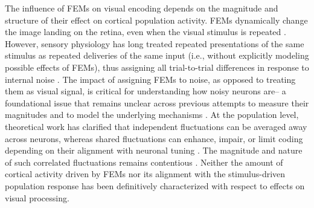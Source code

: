 \documentclass{lite}
\begin{document}
The influence of FEMs on visual encoding depends on the magnitude and structure of their effect on cortical population activity. FEMs dynamically change the image landing on the retina, even when the visual stimulus is repeated \cite{mcfarland2016variability}. However, sensory physiology has long treated repeated presentations of the same stimulus as repeated deliveries of the same input (i.e., without explicitly modeling possible effects of FEMs), thus assigning all trial-to-trial differences in response to internal noise \cite{tolhurst1983statistical, shadlen1998variable}. The impact of assigning FEMs to noise, as opposed to treating them as visual signal, is critical for understanding how noisy neurons are-- a foundational issue that remains unclear across previous attempts to measure their magnitudes and to model the underlying mechanisms \cite{tolhurst1983statistical, softky1993highly, shadlen1998variable, gur1997response}. At the population level, theoretical work has clarified that independent fluctuations can be averaged away across neurons, whereas shared fluctuations can enhance, impair, or limit coding depending on their alignment with neuronal tuning \cite{averbeck2006neural, moreno2014information}. The magnitude and nature of such correlated fluctuations remains contentious \cite{cohen2011measuring}. Neither the amount of cortical activity driven by FEMs nor its alignment with the stimulus-driven population response has been definitively characterized with respect to effects on visual processing.


\end{document}
